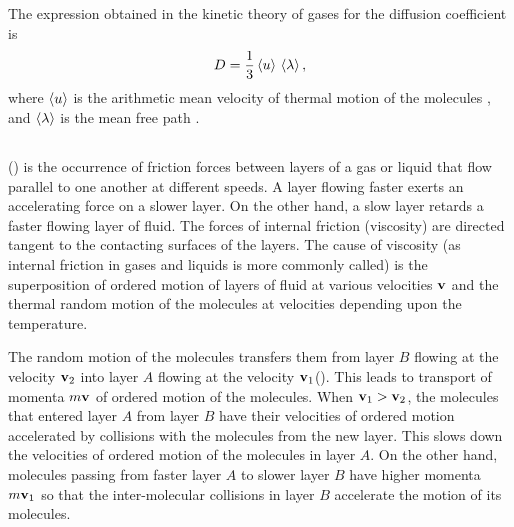 The expression obtained in the kinetic theory of gases for the diffusion coefficient is
\begin{equation*}%
D = \frac{1}{3} \expval{u}\, \expval{\lambda},
\end{equation*}
where $\expval{u}$ is the arithmetic mean velocity of thermal motion of the molecules , and $\expval{\lambda}$ is the mean free path . 

\subsection{}\label{10.8.4}  () is the occurrence of friction forces between layers of a gas or liquid that flow parallel to one another at different speeds. A layer flowing faster exerts an accelerating force on a slower layer. On the other hand, a slow layer retards a faster flowing layer of fluid. The forces of internal friction (viscosity) are directed tangent to the contacting surfaces of the layers. The cause of viscosity (as internal friction in gases and liquids is more commonly called) is the superposition of ordered motion of layers of fluid at various velocities $\vb{v}$ and the thermal random motion of the molecules at velocities depending upon the temperature. 

The random motion of the molecules transfers them from layer $B$ flowing at the velocity $\vb{v}_{2}$ into layer $A$ flowing at the velocity $\vb{v}_{1} $(). This leads to transport of momenta $m\vb{v}$ of ordered motion of the molecules. When $\vb{v}_{1}> \vb{v}_{2}$, the molecules that entered layer $A$ from layer $B$ have their velocities of ordered motion accelerated by collisions with the molecules from the new layer. This slows down the velocities of ordered motion of the molecules in layer $A$. On the other hand, molecules passing from faster layer $A$ to slower layer $B$ have higher mo­menta $m\vb{v}_{1}$ so that the inter-molecular collisions in layer $B$ accelerate the motion of its molecules.

